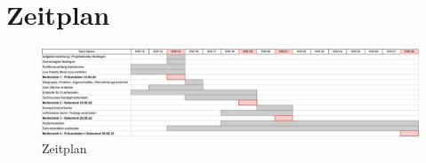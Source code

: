 \chapter*{Zeitplan}

\begin{figure}[!h]
    \centering
    \includegraphics[width=1\textwidth]{Zeitplan_DeskPlanner.png}
    \caption{Zeitplan}
    \label{fig:Zeitplan}
\end{figure}